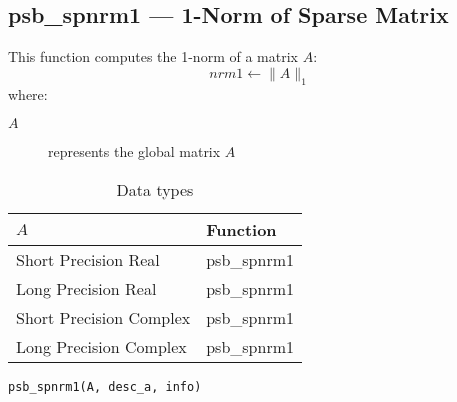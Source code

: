 %
%


\clearpage\subsection*{psb\_spnrm1 --- 1-Norm of Sparse Matrix}

This function computes the 1-norm of a matrix $A$:\\

\[ nrm1 \leftarrow \|A\|_1 \]
where:
\begin{description}
\item[$A$] represents the global matrix $A$
\end{description}

\begin{table}[h]
\begin{center}
\begin{tabular}{ll}
\hline
$A$ & {\bf Function}\\
\hline
Short Precision Real & psb\_spnrm1 \\
Long Precision Real & psb\_spnrm1 \\
Short Precision Complex & psb\_spnrm1 \\
Long Precision Complex & psb\_spnrm1 \\
\hline
\end{tabular}
\end{center}
\caption{Data types\label{tab:f90nrm1}}
\end{table}

\begin{verbatim}
psb_spnrm1(A, desc_a, info)
\end{verbatim}


